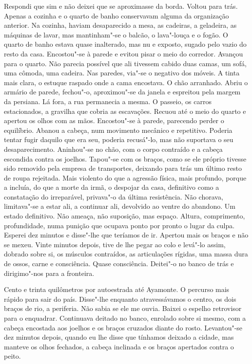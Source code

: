 Respondi que sim e não deixei que se aproximasse da borda. Voltou para
trás. Apenas a cozinha e o quarto de banho conservavam alguma da
organização anterior. Na cozinha, haviam desaparecido a mesa, as
cadeiras, a geladeira, as máquinas de lavar, mas mantinham"-se o
balcão, o lava"-louça e o fogão. O quarto de banho estava quase
inalterado, mas nu e exposto, sugado pelo vazio do resto da casa.
Encostou"-se à parede e evitou pisar o meio do corredor. Avançou para o
quarto. Não parecia possível que ali tivessem cabido duas camas, um
sofá, uma cômoda, uma cadeira. Nas paredes, via"-se o negativo dos
móveis. A tinta mais clara, o estuque raspado onde a cama encostava. O
chão arranhado. Abriu o armário de parede, fechou"-o, aproximou"-se da
janela e espreitou pela margem da persiana. Lá fora, a rua permanecia a
mesma. O passeio, os carros estacionados, a gravilha que cobria as
escavações. Recuou até o meio do quarto e apertou os olhos com as mãos.
Encostou"-se à parede, parecendo perder o equilíbrio. Abanou a cabeça,
num movimento mecânico e repetitivo. Poderia tentar fugir daquilo que
era seu, poderia recusá"-lo, mas não suportava o seu desaparecimento.
Aninhou"-se no chão, com o corpo contraído e a cabeça escondida contra
os joelhos. Tapou"-se com os braços, como se ele próprio tivesse sido
removido pela empresa de transportes, deixando para trás um último resto
de roupa rejeitada. Mais violento do que a agressão física, mais
profundo, porque a incluía, do que a morte da irmã, o despojar da casa,
definitivo como a constatação do irreparável, privava"-o da última
resistência. Não chorava, limitava"-se a estar ali, a continuar ali,
devolvido ao ventre do abandono. Um estado definitivo. Não ameaça, não
suposição, mas espaço. Altura, comprimento, profundidade, numa punição
que ocupava ponto por pronto o lugar da culpa. Esperei dez minutos e
disse"-lhe que teríamos de ir. Apertou mais os braços e não se mexeu.
Vinte minutos depois, tive de lhe pegar ao colo e levá"-lo assim,
dobrado sobre si, os músculos contraídos, as articulações rígidas, uma
massa dura de ossos, carne e consciência. Quase consciência. Deitei"-o
no banco de trás e dirigimo"-nos para a fronteira.

Cento e trinta quilômetros por autoestrada até Ayamonte. O percurso
mais rápido para sair do país. Disse"-lhe enquanto atravessávamos o
centro, os dois braços de rio, a periferia. Não sabia se ele me ouvia.
Baixei o espelho retrovisor para o enquadrar. Continuava deitado no
banco, enrolado sobre si mesmo, com a cabeça encostada aos joelhos e os
braços cruzados diante do rosto. Levantou"-se dez minutos depois, quando
eu lhe disse que tínhamos deixado a cidade, mas manteve os olhos
fechados, a cabeça inclinada e os braços apertados contra o peito.

